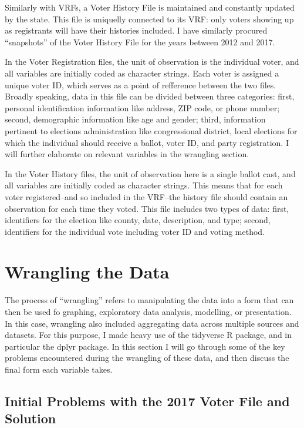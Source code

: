 \documentclass[12pt,twoside]{reedthesis}
\begin{document}
  \clearpage
  
  Similarly with VRFs, a Voter History File is maintained and constantly
  updated by the state. This file is uniquelly connected to its VRF: only
  voters showing up as registrants will have their histories included. I
  have similarly procured ``snapshots'' of the Voter History File for the
  years between 2012 and 2017.
  
  In the Voter Registration files, the unit of observation is the
  individual voter, and all variables are initially coded as character
  strings. Each voter is assigned a unique voter ID, which serves as a
  point of refference between the two files. Broadly speaking, data in
  this file can be divided between three categories: first, personal
  identification information like address, ZIP code, or phone number;
  second, demographic information like age and gender; third, information
  pertinent to elections administration like congressional district, local
  elections for which the individual should receive a ballot, voter ID,
  and party registration. I will further elaborate on relevant variables
  in the wrangling section.
  
  In the Voter History files, the unit of observation here is a single
  ballot cast, and all variables are initially coded as character strings.
  This means that for each voter registered--and so included in the
  VRF--the history file should contain an observation for each time they
  voted. This file includes two types of data: first, identifiers for the
  election like county, date, description, and type; second, identifiers
  for the individual vote including voter ID and voting method.
  
  \section{Wrangling the Data}\label{wrangling-the-data}
  
  The process of ``wrangling'' refers to manipulating the data into a form
  that can then be used fo graphing, exploratory data analysis, modelling,
  or presentation. In this case, wrangling also included aggregating data
  across multiple sources and datasets. For this purpose, I made heavy use
  of the tidyverse R package, and in particular the dplyr package. In this
  section I will go through some of the key problems encountered during
  the wrangling of these data, and then discuss the final form each
  variable takes.
  
  \subsection{Initial Problems with the 2017 Voter File and
  Solution}\label{initial-problems-with-the-2017-voter-file-and-solution}
  
\end{document}
